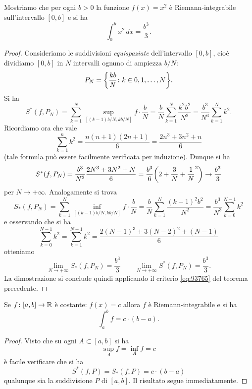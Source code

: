 \begin{example}%
\label{ex:integrale_quadrato}%
Mostriamo che per ogni $b>0$ la funzione $f(x)=x^2$ è Riemann-integrabile sull'intervallo $[0,b]$ e si ha
\[
 \int_0^b x^2\, dx = \frac{b^3}{3}.
\]
\end{example}
\begin{proof}
Consideriamo le suddivisioni \emph{equispaziate} dell'intervallo $[0,b]$, cioè dividiamo $[0,b]$ in $N$ intervalli ognuno di ampiezza $b/N$:
\[
P_N = {\left\{ \frac{kb}{N}\colon k \in 0, 1, \dots, N \right\}}.
\]
Si ha
\[
  S^*(f,P_N) = \sum_{k=1}^N \sup_{[(k-1)b/N,kb/N]}f \cdot \frac b N
   = \frac{b}{N} \sum_{k=1}^N \frac{k^2b^2}{N^2}
   = \frac{b^3}{N^3} \sum_{k=1}^N k^2.
\]
Ricordiamo ora che vale
\[
  \sum_{k=1}^n k^2 = \frac{n(n+1)(2n+1)}{6} = \frac{2n^3+3n^2+n}{6}
\]
(tale formula può essere facilmente verificata per induzione). Dunque si ha
\[
  S^*(f,P_N) = \frac{b^3}{N^3} \frac{2N^3+3N^2+N}{6}
       = \frac{b^3}{6}{\left( 2 + \frac{3}{N}+\frac 1 N^2 \right)}
       \to \frac{b^3}{3}
\]
per $N\to +\infty$.
Analogamente si trova
\[
  S_*(f,P_N) = \sum_{k=1}^N \inf_{[(k-1)b/N,kb/N]} f \cdot \frac{b}{N}
  = \frac{b}{N}\sum_{k=1}^N \frac{(k-1)^2b^2}{N^2}
  = \frac{b^3}{N^3} \sum_{k=0}^{N-1} k^2
\]
e osservando che si ha
\[
 \sum_{k=0}^{N-1} k^2 = \sum_{k=1}^{N-1} k^2 = \frac{2(N-1)^3+3(N-2)^2+(N-1)}{6}
\]
otteniamo
\[
 \lim_{N\to+\infty} S_*(f,P_N) 
 = \frac{b^3}{3}
 \qquad
 \lim_{N\to+\infty} S^*(f,P_N)
  = \frac{b^3}{3}.
\]
La dimostrazione si conclude quindi applicando
il criterio \eqref{eq:93765} del teorema precedente.
\end{proof}

\begin{theorem}
\label{th:integrale_costante}
Se $f\colon[a,b]\to {\mathbb R}$ è costante: $f(x) = c$ allora
$f$ è Riemann-integrabile e si ha
\[
  \int_a^b f = c\cdot (b-a).
\]
\end{theorem}
%
\begin{proof}
Visto che su ogni $A\subset [a,b]$ si ha
\[
  \sup_A f = \inf_A f = c
\]
è facile verificare che si ha
\[
  S^*(f,P) = S_*(f,P) = c\cdot (b-a)
\]
qualunque sia la suddivisione $P$ di $[a,b]$. Il risultato segue immediatamente.
\end{proof}

